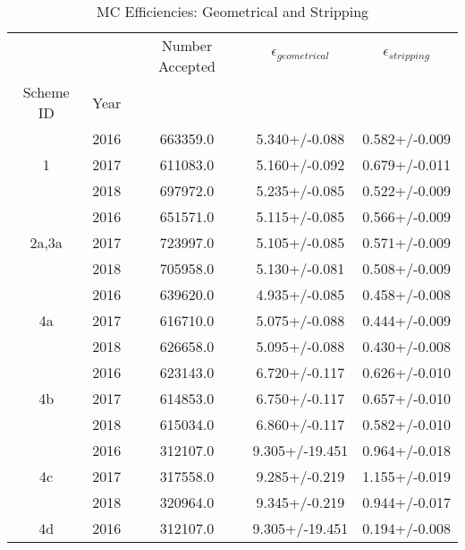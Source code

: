 \begin{table}
\centering
\caption{MC Efficiencies: Geometrical and Stripping}
\label{tab:genstrip_1}
\begin{tabular}{ccccc}
\toprule
   &      &  Number Accepted & $\epsilon_{geometrical}$ & $\epsilon_{stripping}$ \\
Scheme ID & Year &                  &                          &                        \\
\midrule
\multirow{3}{*}{1} & 2016 &         663359.0 &            5.340+/-0.088 &          0.582+/-0.009 \\
   & 2017 &         611083.0 &            5.160+/-0.092 &          0.679+/-0.011 \\
   & 2018 &         697972.0 &            5.235+/-0.085 &          0.522+/-0.009 \\
\cline{1-5}
\multirow{3}{*}{2a,3a} & 2016 &         651571.0 &            5.115+/-0.085 &          0.566+/-0.009 \\
   & 2017 &         723997.0 &            5.105+/-0.085 &          0.571+/-0.009 \\
   & 2018 &         705958.0 &            5.130+/-0.081 &          0.508+/-0.009 \\
\cline{1-5}
\multirow{3}{*}{4a} & 2016 &         639620.0 &            4.935+/-0.085 &          0.458+/-0.008 \\
   & 2017 &         616710.0 &            5.075+/-0.088 &          0.444+/-0.009 \\
   & 2018 &         626658.0 &            5.095+/-0.088 &          0.430+/-0.008 \\
\cline{1-5}
\multirow{3}{*}{4b} & 2016 &         623143.0 &            6.720+/-0.117 &          0.626+/-0.010 \\
   & 2017 &         614853.0 &            6.750+/-0.117 &          0.657+/-0.010 \\
   & 2018 &         615034.0 &            6.860+/-0.117 &          0.582+/-0.010 \\
\cline{1-5}
\multirow{3}{*}{4c} & 2016 &         312107.0 &           9.305+/-19.451 &          0.964+/-0.018 \\
   & 2017 &         317558.0 &            9.285+/-0.219 &          1.155+/-0.019 \\
   & 2018 &         320964.0 &            9.345+/-0.219 &          0.944+/-0.017 \\
\cline{1-5}
\multirow{3}{*}{4d} & 2016 &         312107.0 &           9.305+/-19.451 &          0.194+/-0.008 \\

\end{tabular}
\end{table}
